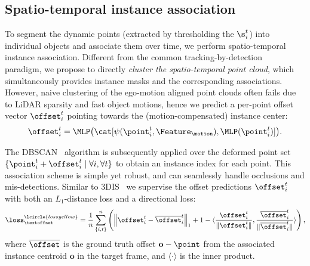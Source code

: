 \subsection{Spatio-temporal instance association}
\label{sec:clustering}
To segment the dynamic points (extracted by thresholding the $\s_i^t$) into individual objects and associate them over time, we perform spatio-temporal instance association.
Different from the common tracking-by-detection~\cite{dendorfer2021motchallenge,weng20203d} paradigm, we propose to directly \emph{cluster the spatio-temporal point cloud}, which simultaneously provides instance masks and the corresponding associations.
However, naive clustering of the ego-motion aligned point clouds often fails due to LiDAR sparsity and fast object motions, hence we predict a per-point offset vector $\offset_i^t$ pointing towards %
the (motion-compensated) instance center:
\begin{equation}
    \offset_{i}^t = \MLP\big(\cat[\psi(\point_i^t, \Feature_\motion), \MLP(\point_i^t)]\big).
\end{equation}

The DBSCAN~\cite{ester1996density} algorithm is subsequently applied over the deformed point set $\{\point_i^t + \offset_i^t \; | \; \forall i, \forall t\}$ to obtain an instance index for each point.
This association scheme is simple yet robust, and can seamlessly handle occlusions and mis-detections.
Similar to 3DIS~\cite{lahoud20193d} we supervise the offset predictions $\offset_i^t$ with both an $L_1$-distance loss and a directional
loss:
\begin{equation}
\loss_\textoffset^\lcircle{lossyellow} =\frac{1}{n}  \sum_{\{i,t\}}^n \left( \left\| \offset_i^t  - \overline{\offset}_i^t \right\|_{1} + 1 - \langle \frac{\offset_i^t}{\| \offset_i^t\|}, \frac{\overline{\offset}_i^t}{\| \overline{\offset}_i^t\|} \rangle \right),
\end{equation}
where $\overline{\offset}$ is the ground truth offset $\mathbf{o}-\point$ from the associated instance centroid $\mathbf{o}$ in the target frame, and $\langle \cdot \rangle$ is the inner product.


